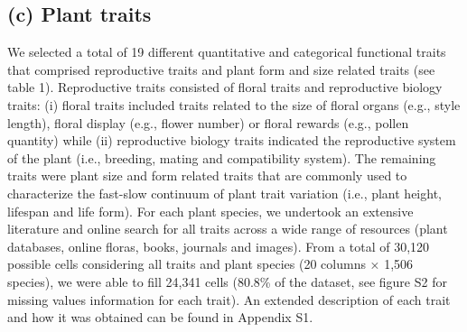 \documentclass[
  12pt,
  a4paper,
]{article}
\begin{document}
\hypertarget{c-plant-traits}{%
\subsection{(c) Plant traits}\label{c-plant-traits}}

We selected a total of 19 different quantitative and categorical functional traits that comprised reproductive traits and plant form and size related traits (see table 1). Reproductive traits consisted of floral traits and reproductive biology traits: (i) floral traits included traits related to the size of floral organs (e.g., style length), floral display (e.g., flower number) or floral rewards (e.g., pollen quantity) while (ii) reproductive biology traits indicated the reproductive system of the plant (i.e., breeding, mating and compatibility system). The remaining traits were plant size and form related traits that are commonly used to characterize the fast-slow continuum of plant trait variation (i.e., plant height, lifespan and life form). For each plant species, we undertook an extensive literature and online search for all traits across a wide range of resources (plant databases, online floras, books, journals and images). From a total of 30,120 possible cells considering all traits and plant species (20 columns × 1,506 species), we were able to fill 24,341 cells (80.8\% of the dataset, see figure S2 for missing values information for each trait). An extended description of each trait and how it was obtained can be found in Appendix S1.

\singlespacing
\end{document}

